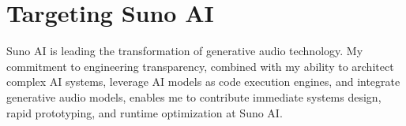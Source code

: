 \documentclass[11pt,a4paper,sans]{moderncv}
\begin{document}
\section{Targeting Suno AI}
Suno AI is leading the transformation of generative audio technology. My commitment to engineering transparency, combined with my ability to architect complex AI systems, leverage AI models as code execution engines, and integrate generative audio models, enables me to contribute immediate systems design, rapid prototyping, and runtime optimization at Suno AI.
\end{document}
